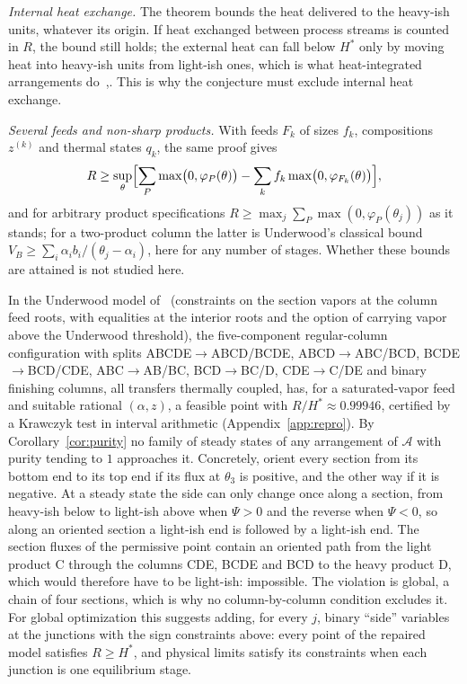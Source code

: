 \documentclass[11pt,a4paper]{report}
\newcommand{\cA}{\mathcal A}
\newcommand{\Hs}{H^{*}}
\begin{document}
\emph{Internal heat exchange.} The theorem bounds the heat delivered to the heavy-ish units, whatever its origin. If heat
exchanged between process streams is counted in \(R\), the bound still holds; the external heat can fall below \(\Hs\) only
by moving heat into heavy-ish units from light-ish ones, which is what heat-integrated arrangements
do~\autocite[\S6.5]{HalvorsenThesis},\autocite{Mathew2019}. This is why the conjecture must exclude internal heat
exchange.

\emph{Several feeds and non-sharp products.} With feeds \(F_k\) of sizes \(f_k\), compositions \(z^{(k)}\) and thermal states
\(q_k\), the same proof gives
\[R\ge\sup_\theta\Bigl[\sum_P\max\bigl(0,\varphi_P(\theta)\bigr)-\sum_kf_k\max\bigl(0,\varphi_{F_k}(\theta)\bigr)\Bigr],\]
and for arbitrary product specifications \(R\ge\max_j\sum_P\max(0,\varphi_P(\theta_j))\) as it stands; for a two-product column
the latter is Underwood's classical bound \(V_B\ge\sum_i\alpha_ib_i/(\theta_j-\alpha_i)\), here for any number of stages.
Whether these bounds are attained is not studied here.

\begin{remark}\label{rem:permissive}
In the Underwood model of~\autocite{TGAT} (constraints on the section vapors at the column feed roots, with equalities at
the interior roots and the option of carrying vapor above the Underwood threshold), the five-component regular-column
configuration with splits ABCDE\(\to\)ABCD/BCDE, ABCD\(\to\)ABC/BCD, BCDE\(\to\)BCD/CDE, ABC\(\to\)AB/BC,
BCD\(\to\)BC/D, CDE\(\to\)C/DE and binary finishing columns, all transfers thermally coupled, has, for a saturated-vapor feed
and suitable rational \((\alpha,z)\), a feasible point with \(R/\Hs\approx0.99946\), certified by a Krawczyk test in interval
arithmetic (Appendix~\ref{app:repro}). By Corollary~\ref{cor:purity} no family of steady states of any arrangement of
\(\cA\) with purity tending to \(1\) approaches it. Concretely, orient every section from its bottom end to its top end if
its flux at \(\theta_3\) is positive, and the other way if it is negative. At a steady state the side can only change once
along a section, from heavy-ish below to light-ish above when \(\Psi>0\) and the reverse when \(\Psi<0\), so along an
oriented section a light-ish end is followed by a light-ish end. The section fluxes of the permissive point contain an
oriented path from the light product C through the columns CDE, BCDE and BCD to the heavy product D, which would therefore
have to be light-ish: impossible. The violation is global, a
chain of four sections, which is why no column-by-column condition excludes it. For global optimization this suggests
adding, for every \(j\), binary ``side'' variables at the junctions with the sign constraints above: every point of the
repaired model satisfies \(R\ge\Hs\), and physical limits satisfy its constraints when each junction is one equilibrium
stage.
\end{remark}
\end{document}
